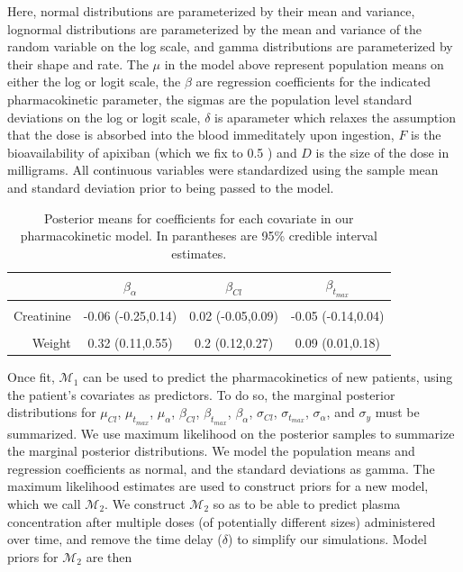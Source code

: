 Here, normal distributions are parameterized by their mean and variance, lognormal distributions are parameterized by the mean and variance of the random variable on the log scale, and gamma distributions are parameterized by their shape and rate.  The $\mu$ in the model above represent population means on either the log or logit scale, the $\beta$ are regression coefficients for the indicated pharmacokinetic parameter, the sigmas are the population level standard deviations on the log or logit scale, $\delta$ is aparameter which relaxes the assumption that the dose is absorbed into the blood immeditately upon ingestion, $F$ is the bioavailability of apixiban (which we fix to 0.5 \cite{byon2019apixaban}) and $D$ is the size of the dose in milligrams.  All continuous variables were standardized using the sample mean and standard deviation prior to being passed to the model. 

\begin{table}\label{tab:coefs}
	\centering
	\begin{tabular}[t]{rccc}
		\toprule
		& $\beta_\alpha$ & $\beta_{Cl}$ & $\beta_{t_{max}}$\\
		\midrule
		\cellcolor{gray!6}{Age} & \cellcolor{gray!6}{-0.08 (-0.27,0.1)} & \cellcolor{gray!6}{0.01 (-0.06,0.08)} & \cellcolor{gray!6}{-0.01 (-0.1,0.08)}\\
		Creatinine & -0.06 (-0.25,0.14) & 0.02 (-0.05,0.09) & -0.05 (-0.14,0.04)\\
		\cellcolor{gray!6}{Sex} & \cellcolor{gray!6}{-0.2 (-0.53,0.15)} & \cellcolor{gray!6}{0.39 (0.23,0.54)} & \cellcolor{gray!6}{-0.01 (-0.18,0.15)}\\
		Weight & 0.32 (0.11,0.55) & 0.2 (0.12,0.27) & 0.09 (0.01,0.18)\\
		\bottomrule
	\end{tabular}
	\caption{Posterior means for coefficients for each covariate in our pharmacokinetic model.  In parantheses are 95\% credible interval estimates.}
\end{table}
Once fit, $ \mathcal{M}_1$ can be used to predict the pharmacokinetics of new patients, using the patient’s covariates as predictors.  To do so, the marginal posterior distributions for $ \mu_{Cl} $, $ \mu_{t_{max}} $, $ \mu_{\alpha}$, $ \beta_{Cl} $, $ \beta_{t_{max}} $, $ \beta_{\alpha} $, $ \sigma_{Cl} $, $ \sigma_{t_{max}} $, $ \sigma_{\alpha} $, and $ \sigma_y $ must be summarized.  We use maximum likelihood on the posterior samples to summarize the marginal posterior distributions. We model the population means  and regression coefficients as normal, and the standard deviations  as gamma.  The maximum likelihood estimates are used to construct priors for a new model, which we call $ \mathcal{M}_2 $. We construct $ \mathcal{M}_2 $ so as to be able to predict plasma concentration after multiple doses (of potentially different sizes) administered over time, and remove the time delay ($ \delta $) to simplify our simulations.  Model priors for $ \mathcal{M}_2 $ are then 

